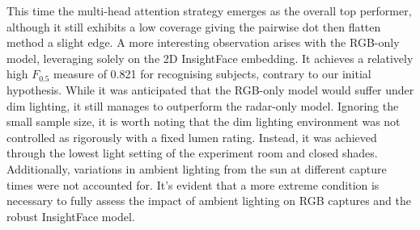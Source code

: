 \documentclass{mpaper}
\begin{document}
\begin{table}[htbp]
    \centering
    \vspace{-0.1cm}
    \vspace{0.1cm}
    \caption{Averaged accuracy and $F_{0.5}$ score for the seven fusion strategies and individual modalities against the \textbf{dim lighting} settings only. Equal weighting is applied to subject and liveness predictions.}
    \label{tab:dimlighting_averaged_acc_fb}
    \vspace{-0.2cm}
\end{table}

This time the multi-head attention strategy emerges as the overall top performer, although it still exhibits a low coverage giving the pairwise dot then flatten method a slight edge. A more interesting observation arises with the RGB-only model, leveraging solely on the 2D InsightFace embedding. It achieves a relatively high $F_{0.5}$ measure of 0.821 for recognising subjects, contrary to our initial hypothesis. While it was anticipated that the RGB-only model would suffer under dim lighting, it still manages to outperform the radar-only model. Ignoring the small sample size, it is worth noting that the dim lighting environment was not controlled as rigorously with a fixed lumen rating. Instead, it was achieved through the lowest light setting of the experiment room and closed shades. Additionally, variations in ambient lighting from the sun at different capture times were not accounted for. It's evident that a more extreme condition is necessary to fully assess the impact of ambient lighting on RGB captures and the robust InsightFace model.
\end{document}
